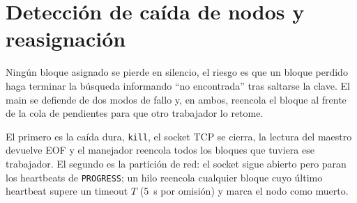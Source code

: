 \section{Detección de caída de nodos y reasignación}\label{sec:death}
Ningún bloque asignado se pierde en silencio, el riesgo es que un bloque perdido haga terminar la búsqueda informando ``no encontrada'' tras saltarse la clave. El main se defiende de dos modos de fallo y, en ambos, reencola el bloque al frente de la cola de pendientes para que otro trabajador lo retome.

El primero es la caída dura, \texttt{kill}, el socket TCP se cierra, la lectura del maestro devuelve EOF y el manejador reencola todos los bloques que tuviera ese trabajador. El segundo es la partición de red: el socket sigue abierto pero paran los heartbeats de \texttt{PROGRESS}; un hilo reencola cualquier bloque cuyo último heartbeat supere un timeout $T$ (5~s por omisión) y marca el nodo como muerto.

